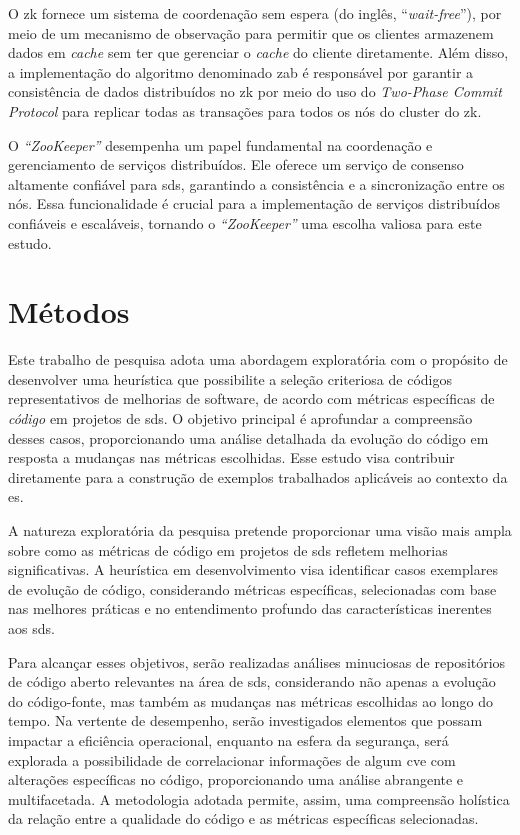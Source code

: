 O \gls{zk} fornece um sistema de coordenação sem espera (do inglês, ``\textit{wait-free}''), por meio de um mecanismo de observação para permitir que os clientes armazenem dados em \textit{cache} sem ter que gerenciar o \textit{cache} do cliente diretamente. Além disso, a implementação do algoritmo denominado \gls{zab} é responsável por garantir a consistência de dados distribuídos no \gls{zk} por meio do uso do \textit{Two-Phase Commit Protocol} para replicar todas as transações para todos os nós do cluster do \gls{zk}\cite{CloudKarafkaZAB}.

O \textit{``ZooKeeper''} desempenha um papel fundamental na coordenação e gerenciamento de serviços distribuídos. Ele oferece um serviço de consenso altamente confiável para \gls{sds}, garantindo a consistência e a sincronização entre os nós. Essa funcionalidade é crucial para a implementação de serviços distribuídos confiáveis e escaláveis, tornando o \textit{``ZooKeeper''} uma escolha valiosa para este estudo.

\section{Métodos}\label{sec:metodo}
Este trabalho de pesquisa adota uma abordagem exploratória com o propósito de desenvolver uma heurística que possibilite a seleção criteriosa de códigos representativos de melhorias de software, de acordo com métricas específicas de \textit{código} em projetos de \gls{sds}. O objetivo principal é aprofundar a compreensão desses casos, proporcionando uma análise detalhada da evolução do código em resposta a mudanças nas métricas escolhidas. Esse estudo visa contribuir diretamente para a construção de exemplos trabalhados aplicáveis ao contexto da \gls{es}.

A natureza exploratória da pesquisa pretende proporcionar uma visão mais ampla sobre como as métricas de código em projetos de \gls{sds} refletem melhorias significativas. A heurística em desenvolvimento visa identificar casos exemplares de evolução de código, considerando métricas específicas, selecionadas com base nas melhores práticas e no entendimento profundo das características inerentes aos \gls{sds}.

Para alcançar esses objetivos, serão realizadas análises minuciosas de repositórios de código aberto relevantes na área de \gls{sds}, considerando não apenas a evolução do código-fonte, mas também as mudanças nas métricas escolhidas ao longo do tempo. Na vertente de desempenho, serão investigados elementos que possam impactar a eficiência operacional, enquanto na esfera da segurança, será explorada a possibilidade de correlacionar informações de algum \gls{cve} \cite{cve-details} com alterações específicas no código, proporcionando uma análise abrangente e multifacetada. A metodologia adotada permite, assim, uma compreensão holística da relação entre a qualidade do código e as métricas específicas selecionadas.

